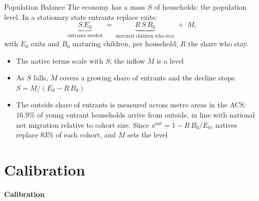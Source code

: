 \documentclass[11pt,aspectratio=169]{beamer}
\begin{document}
\begin{frame}{Population Balance}
The economy has a mass $S$ of households: the population level. In a stationary state entrants replace exits:
\[
\underbrace{S\,E_0}_{\text{entrants needed}}
\;=\;
\underbrace{R\,S\,B_0}_{\text{matured children who stay}}
\;+\; M ,
\]
with $E_0$ exits and $B_0$ maturing children, per household; $R$ the share who stay.
\begin{itemize}
  \item The native terms scale with $S$; the inflow $M$ is a level
  \item As $S$ falls, $M$ covers a growing share of entrants and the decline stops: $S = M/(E_0 - R\,B_0)$
  \item The outside share of entrants is measured across metro areas in the ACS: $16.9\%$ of young entrant households arrive from outside, in line with national net migration relative to cohort size. Since $s^{out} = 1 - R\,B_0/E_0$, natives replace $83\%$ of each cohort, and $M$ sets the level
\end{itemize}
\end{frame}

\section{Calibration}

\begin{frame}
\centering
{\Large\textbf{Calibration}}
\end{frame}
\end{document}
